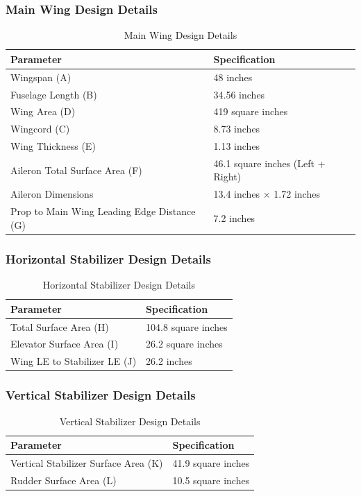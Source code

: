 \subsubsection*{Main Wing Design Details}
\begin{table}[H]
  \centering
  \begin{tabular}{|l|l|}
  \hline
  \textbf{Parameter} & \textbf{Specification} \\
  \hline
  Wingspan (A) & 48 inches \\
  Fuselage Length (B) & 34.56 inches \\
  Wing Area (D) & 419 square inches \\
  Wingcord (C) & 8.73 inches \\
  Wing Thickness (E) & 1.13 inches \\
  Aileron Total Surface Area (F) & 46.1 square inches (Left + Right) \\
  Aileron Dimensions & 13.4 inches × 1.72 inches \\
  Prop to Main Wing Leading Edge Distance (G) & 7.2 inches \\
  \hline
  \end{tabular}
  \caption{Main Wing Design Details}
  \label{tab:main_wing}
\end{table}

\subsubsection*{Horizontal Stabilizer Design Details}
\begin{table}[H]
\centering
\begin{tabular}{|l|l|}
\hline
\textbf{Parameter} & \textbf{Specification} \\
\hline
Total Surface Area (H) & 104.8 square inches \\
Elevator Surface Area (I) & 26.2 square inches \\
Wing LE to Stabilizer LE (J) & 26.2 inches \\
\hline
\end{tabular}
\caption{Horizontal Stabilizer Design Details}
\label{tab:main_wing}
\end{table}


\subsubsection*{Vertical Stabilizer Design Details}
\begin{table}[H]
\centering
\begin{tabular}{|l|l|}
\hline
\textbf{Parameter} & \textbf{Specification} \\
\hline
Vertical Stabilizer Surface Area (K) & 41.9 square inches \\
Rudder Surface Area (L) & 10.5 square inches \\
\hline
\end{tabular}
\caption{Vertical Stabilizer Design Details}
  \label{tab:main_wing}
\end{table}

